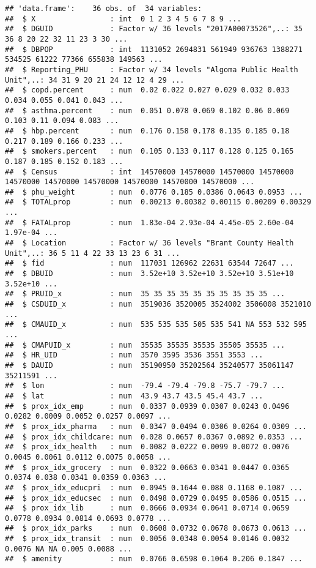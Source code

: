 \documentclass[]{article}
\begin{document}
\begin{verbatim}
## 'data.frame':    36 obs. of  34 variables:
##  $ X                 : int  0 1 2 3 4 5 6 7 8 9 ...
##  $ DGUID             : Factor w/ 36 levels "2017A00073526",..: 35 36 8 20 22 32 11 23 3 30 ...
##  $ DBPOP             : int  1131052 2694831 561949 936763 1388271 534525 61222 77366 655838 149563 ...
##  $ Reporting_PHU     : Factor w/ 34 levels "Algoma Public Health Unit",..: 34 31 9 20 21 24 12 12 4 29 ...
##  $ copd.percent      : num  0.02 0.022 0.027 0.029 0.032 0.033 0.034 0.055 0.041 0.043 ...
##  $ asthma.percent    : num  0.051 0.078 0.069 0.102 0.06 0.069 0.103 0.11 0.094 0.083 ...
##  $ hbp.percent       : num  0.176 0.158 0.178 0.135 0.185 0.18 0.217 0.189 0.166 0.233 ...
##  $ smokers.percent   : num  0.105 0.133 0.117 0.128 0.125 0.165 0.187 0.185 0.152 0.183 ...
##  $ Census            : int  14570000 14570000 14570000 14570000 14570000 14570000 14570000 14570000 14570000 14570000 ...
##  $ phu_weight        : num  0.0776 0.185 0.0386 0.0643 0.0953 ...
##  $ TOTALprop         : num  0.00213 0.00382 0.00115 0.00209 0.00329 ...
##  $ FATALprop         : num  1.83e-04 2.93e-04 4.45e-05 2.60e-04 1.97e-04 ...
##  $ Location          : Factor w/ 36 levels "Brant County Health Unit",..: 36 5 11 4 22 33 13 23 6 31 ...
##  $ fid               : num  117031 126962 22631 63544 72647 ...
##  $ DBUID             : num  3.52e+10 3.52e+10 3.52e+10 3.51e+10 3.52e+10 ...
##  $ PRUID_x           : num  35 35 35 35 35 35 35 35 35 35 ...
##  $ CSDUID_x          : num  3519036 3520005 3524002 3506008 3521010 ...
##  $ CMAUID_x          : num  535 535 535 505 535 541 NA 553 532 595 ...
##  $ CMAPUID_x         : num  35535 35535 35535 35505 35535 ...
##  $ HR_UID            : num  3570 3595 3536 3551 3553 ...
##  $ DAUID             : num  35190950 35202564 35240577 35061147 35211591 ...
##  $ lon               : num  -79.4 -79.4 -79.8 -75.7 -79.7 ...
##  $ lat               : num  43.9 43.7 43.5 45.4 43.7 ...
##  $ prox_idx_emp      : num  0.0337 0.0939 0.0307 0.0243 0.0496 0.0282 0.0009 0.0052 0.0257 0.0097 ...
##  $ prox_idx_pharma   : num  0.0347 0.0494 0.0306 0.0264 0.0309 ...
##  $ prox_idx_childcare: num  0.028 0.0657 0.0367 0.0892 0.0353 ...
##  $ prox_idx_health   : num  0.0082 0.0222 0.0099 0.0072 0.0076 0.0045 0.0061 0.0112 0.0075 0.0058 ...
##  $ prox_idx_grocery  : num  0.0322 0.0663 0.0341 0.0447 0.0365 0.0374 0.038 0.0341 0.0359 0.0363 ...
##  $ prox_idx_educpri  : num  0.0945 0.1644 0.088 0.1168 0.1087 ...
##  $ prox_idx_educsec  : num  0.0498 0.0729 0.0495 0.0586 0.0515 ...
##  $ prox_idx_lib      : num  0.0666 0.0934 0.0641 0.0714 0.0659 0.0778 0.0934 0.0814 0.0693 0.0778 ...
##  $ prox_idx_parks    : num  0.0608 0.0732 0.0678 0.0673 0.0613 ...
##  $ prox_idx_transit  : num  0.0056 0.0348 0.0054 0.0146 0.0032 0.0076 NA NA 0.005 0.0088 ...
##  $ amenity           : num  0.0766 0.6598 0.1064 0.206 0.1847 ...
\end{verbatim}
\end{document}
